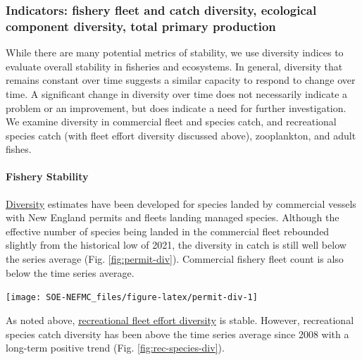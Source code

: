 \documentclass[
  10pt,
]{article}
\let\origfigure\figure
\let\endorigfigure\endfigure
\renewenvironment{figure}[1][2] {
    \expandafter\origfigure\expandafter[H]
} {
    \endorigfigure
}
\begin{document}
\hypertarget{indicators-fishery-fleet-and-catch-diversity-ecological-component-diversity-total-primary-production}{%
\subsubsection{Indicators: fishery fleet and catch diversity, ecological component diversity, total primary production}\label{indicators-fishery-fleet-and-catch-diversity-ecological-component-diversity-total-primary-production}}

While there are many potential metrics of stability, we use diversity indices to evaluate overall stability in fisheries and ecosystems. In general, diversity that remains constant over time suggests a similar capacity to respond to change over time. A significant change in diversity over time does not necessarily indicate a problem or an improvement, but does indicate a need for further investigation. We examine diversity in commercial fleet and species catch, and recreational species catch (with fleet effort diversity discussed above), zooplankton, and adult fishes.

\hypertarget{fishery-stability}{%
\paragraph{Fishery Stability}\label{fishery-stability}}

\href{https://noaa-edab.github.io/catalog/commercial_div.html}{Diversity} estimates have been developed for species landed by commercial vessels with New England permits and fleets landing managed species. Although the effective number of species being landed in the commercial fleet rebounded slightly from the historical low of 2021, the diversity in catch is still well below the series average (Fig. \ref{fig:permit-div}). Commercial fishery fleet count is also below the time series average.

\begin{figure}

{\centering \texttt{[image: SOE-NEFMC\_files/figure-latex/permit-div-1]} 

}

\caption{Species revenue diversity in New England.}\label{fig:permit-div}
\end{figure}

As noted above, \href{https://noaa-edab.github.io/catalog/recdat.html}{recreational fleet effort diversity} is stable. However, recreational species catch diversity has been above the time series average since 2008 with a long-term positive trend (Fig. \ref{fig:rec-species-div}).
\end{document}
